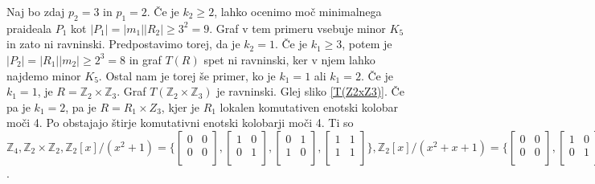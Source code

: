\documentclass[a4paper, 12pt]{amsart}
\theoremstyle{definition} %
\theoremstyle{plain} %
\newcommand{\Z}{\mathbb Z}
\begin{document}
\begin{enumerate}
Naj bo zdaj $p_2 = 3$ in $p_1 = 2$. Če je $k_2 \ge 2$, lahko ocenimo moč minimalnega praideala $P_1$ kot $|P_1| = |m_1||R_2| \ge 3^2 = 9$. Graf v tem primeru vsebuje minor $K_5$ in zato ni ravninski. Predpostavimo torej, da je $k_2 = 1$. Če je $k_1 \ge 3$, potem je $|P_2| = |R_1||m_2| \ge 2^3 = 8$ in graf $T(R)$ spet ni ravninski, ker v njem lahko najdemo minor $K_5$. Ostal nam je torej še primer, ko je $k_1= 1$ ali $k_1=2$. Če je $k_1= 1$, je $R= \Z_2 \times \Z_3$. Graf $T(\Z_2 \times \Z_3)$ je ravninski. Glej sliko \ref{T(Z2xZ3)}. Če pa je $k_1 = 2$, pa je $R = R_1 \times Z_3$, kjer je $R_1$ lokalen komutativen enotski kolobar moči 4. Po \cite{Dresden-smallRings} obstajajo štirje komutativni enotski kolobarji moči 4. Ti so $\Z_4, \Z_2 \times \Z_2, \Z_2[x]/(x^2 + 1) = \big\{
\begin{bmatrix}
0 & 0 \\
0 & 0 \\
\end{bmatrix},
\begin{bmatrix}
1 & 0 \\
0 & 1 \\
\end{bmatrix},
\begin{bmatrix}
0 & 1 \\
1 & 0 \\
\end{bmatrix},
\begin{bmatrix}
1 & 1 \\
1 & 1 \\
\end{bmatrix} \big\}, 
\Z_2[x]/(x^2  + x +1) = \big\{
\begin{bmatrix}
0 & 0 \\
0 & 0 \\
\end{bmatrix},
\begin{bmatrix}
1 & 0 \\
0 & 1 \\
\end{bmatrix},
\begin{bmatrix}
1 & 1 \\
1 & 0 \\
\end{bmatrix},
\begin{bmatrix}
0 & 1 \\
1 & 1 \\
\end{bmatrix} \big\}
$. 

\end{enumerate}
\end{document}
